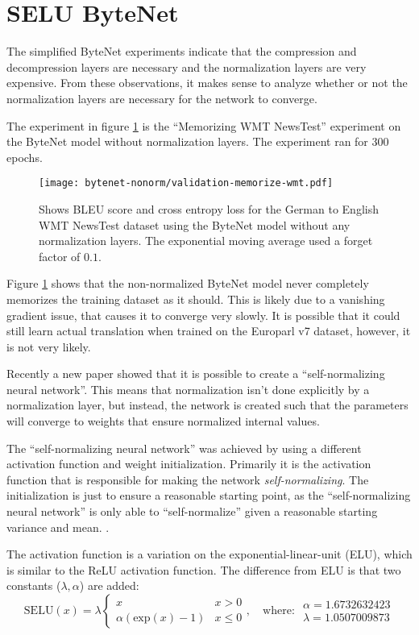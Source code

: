 \section{SELU ByteNet}

The simplified ByteNet experiments indicate that the compression and decompression layers are necessary and the normalization layers are very expensive. From these observations, it makes sense to analyze whether or not the normalization layers are necessary for the network to converge.

The experiment in figure \ref{fig:result:selu-bytenet:bytenet-nonorm-wmt} is the ``Memorizing WMT NewsTest'' experiment on the ByteNet model without normalization layers. The experiment ran for 300 epochs.

\begin{figure}[h]
    \centering
    \texttt{[image: bytenet-nonorm/validation-memorize-wmt.pdf]}
    \caption{Shows BLEU score and cross entropy loss for the German to English WMT NewsTest dataset using the ByteNet model without any normalization layers. The exponential moving average used a forget factor of $0.1$.}
    \label{fig:result:selu-bytenet:bytenet-nonorm-wmt}
\end{figure}

Figure \ref{fig:result:selu-bytenet:bytenet-nonorm-wmt} shows that the non-normalized ByteNet model never completely memorizes the training dataset as it should. This is likely due to a vanishing gradient issue, that causes it to converge very slowly. It is possible that it could still learn actual translation when trained on the Europarl v7 dataset, however, it is not very likely.

Recently a new paper showed that it is possible to create a ``self-normalizing neural network''. This means that normalization isn't done explicitly by a normalization layer, but instead, the network is created such that the parameters will converge to weights that ensure normalized internal values.

The ``self-normalizing neural network'' was achieved by using a different activation function and weight initialization. Primarily it is the activation function that is responsible for making the network \textit{self-normalizing}. The initialization is just to ensure a reasonable starting point, as the ``self-normalizing neural network'' is only able to ``self-normalize'' given a reasonable starting variance and mean. \cite{selu}.

The activation function is a variation on the exponential-linear-unit (ELU), which is similar to the ReLU activation function. The difference from ELU is that two constants ($\lambda, \alpha$) are added:
\begin{equation}
\mathrm{SELU}(x) = \lambda \begin{cases}
  x & x > 0 \\
  \alpha (\mathrm{exp}(x) - 1) & x \le 0
\end{cases},\quad \text{where: } \begin{array}{c}
  \alpha = 1.6732632423 \\
  \lambda = 1.0507009873
\end{array}
\end{equation}

